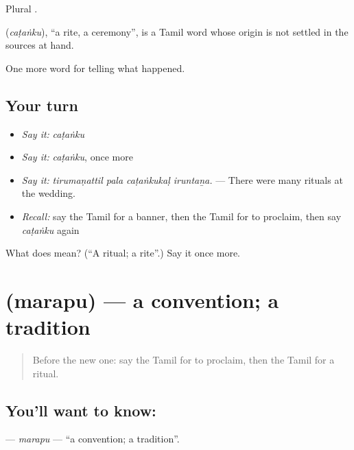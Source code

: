 Plural .

\begin{cousinweb}
\textbf{} (\emph{caṭaṅku}), \textquotedblleft{}a rite, a ceremony\textquotedblright{}, is a Tamil word whose origin is not settled in the sources at hand.
\end{cousinweb}

\begin{grammarlens}[title={What you've built}]
One more word for telling what happened.
\end{grammarlens}

\subsection*{Your turn}
\begin{itemize}
\raggedright
  \item \emph{Say it:} \emph{caṭaṅku}
  \item \emph{Say it:} \emph{caṭaṅku}, once more
  \item \emph{Say it:} \emph{tirumaṇattil pala caṭaṅkukaḷ iruntaṉa.} — There were many rituals at the wedding.
  \item \emph{Recall:} say the Tamil for a banner, then the Tamil for to proclaim, then say \emph{caṭaṅku} again
\end{itemize}

\begin{tcolorbox}[breakable,colback=teal!4,colframe=teal!35!black,title={Before you move on}]
What does  mean? (\textquotedblleft{}A ritual; a rite\textquotedblright{}.) Say it once more.
\end{tcolorbox}
\section[\texorpdfstring{\ta{மரபு} (marapu)}{மரபு (marapu)}]{ (marapu) — a convention; a tradition}

\label{lesson:TA-C321-marapu}



\begin{quote}
Before the new one: say the Tamil for to proclaim, then the Tamil for a ritual.
\end{quote}

\subsection*{You'll want to know: }
\textbf{} — \emph{marapu} — \textquotedblleft{}a convention; a tradition\textquotedblright{}.

